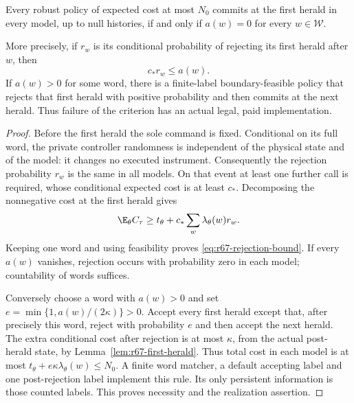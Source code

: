 \begin{theorem}\label{thm:r67-rigidity}
Every robust policy of expected cost at most $N_0$ commits at the first herald in every model, up to null histories, if and only if $a(w)=0$ for every $w\in\mathcal W$.

More precisely, if $r_w$ is its conditional probability of rejecting its first herald after $w$, then
\begin{equation}\label{eq:r67-rejection-bound}
 c_*r_w\le a(w).
\end{equation}
If $a(w)>0$ for some word, there is a finite-label boundary-feasible policy that rejects that first herald with positive probability and then commits at the next herald. Thus failure of the criterion has an actual legal, paid implementation.
\end{theorem}
\begin{proof}
Before the first herald the sole command is fixed. Conditional on its full word, the private controller randomness is independent of the physical state and of the model: it changes no executed instrument. Consequently the rejection probability $r_w$ is the same in all models. On that event at least one further call is required, whose conditional expected cost is at least $c_*$. Decomposing the nonnegative cost at the first herald gives
\[
 \E_\theta C_\tau\ge t_\theta+
                 c_*\sum_w\lambda_\theta(w)r_w.
\]
Keeping one word and using feasibility proves \eqref{eq:r67-rejection-bound}. If every $a(w)$ vanishes, rejection occurs with probability zero in each model; countability of words suffices.

Conversely choose a word with $a(w)>0$ and set
$e=\min\{1,a(w)/(2\kappa)\}>0$.
Accept every first herald except that, after precisely this word, reject with probability $e$ and then accept the next herald. The extra conditional cost after rejection is at most $\kappa$, from the actual post-herald state, by Lemma~\ref{lem:r67-first-herald}. Thus total cost in each model is at most
$t_\theta+e\kappa\lambda_\theta(w)\le N_0$.
A finite word matcher, a default accepting label and one post-rejection label implement this rule. Its only persistent information is those counted labels. This proves necessity and the realization assertion.
\end{proof}

